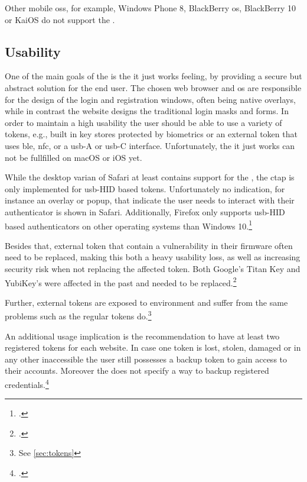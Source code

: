 Other mobile \glspl{os}, for example, Windows Phone 8, BlackBerry \gls{os}, BlackBerry 10 or KaiOS do not support the \wa.

\subsection{Usability}

One of the main goals of the \wa{} is the \frqq it just works\flqq{} feeling, by providing a secure but abstract solution for the end user. The chosen web browser and \gls{os} are responsible for the design of the login and registration windows, often being native overlays, while in contrast the website designs the traditional login masks and forms. In order to maintain a high usability the user should be able to use a variety of tokens, e.g., built in key stores protected by biometrics or an external token that uses \gls{ble}, \gls{nfc}, or a \gls{usb}-A or \gls{usb}-C interface. Unfortunately, the \frqq it just works\flqq{} can not be fullfilled on macOS or iOS yet.

While the desktop varian of Safari at least contains support for the \wa, the \gls{ctap} is only implemented for \gls{usb}-HID based tokens. Unfortunately no indication, for instance an overlay or popup, that indicate the user needs to interact with their authenticator is shown in Safari. Additionally, Firefox only supports \gls{usb}-HID based authenticators on other operating systems than Windows 10.\footcites[See][]{rust-authenticator}

Besides that, external token that contain a vulnerability in their firmware often need to be replaced, making this both a heavy usability loss, as well as increasing security risk when not replacing the affected token. Both Google's Titan Key and YubiKey's were affected in the past and needed to be replaced.\footcites[See][]{yubikey-heise}[See][]{titan-key}

Further, external tokens are exposed to environment and suffer from the same problems such as the regular tokens do.\footnote{See \autoref{sec:tokens}}

An additional usage implication is the recommendation to have at least two registered tokens for each website.  In case one token is lost, stolen, damaged or in any other inaccessible the user still possesses a backup token to gain access to their accounts. Moreover the \wa{} does not specify a way to backup registered credentials.\footcites[See][Chapter 13.6]{w3c}

